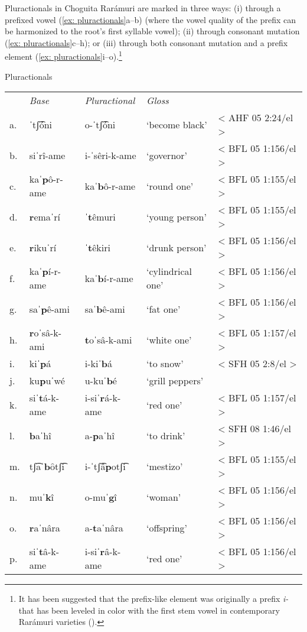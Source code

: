 Pluractionals in Choguita Rarámuri are marked in three ways: (i) through a prefixed vowel (\ref{ex: pluractionals}a--b) (where the vowel quality of the prefix can be harmonized to the root’s first syllable vowel); (ii) through consonant mutation (\ref{ex: pluractionals}c--h); or (iii) through both consonant mutation and a prefix element (\ref{ex: pluractionals}i--o).\footnote{It has been suggested that the prefix-like element was originally a prefix \textit{i-} that has been leveled in color with the first stem vowel in contemporary Rarámuri varieties (\citealt{lionnet2001elementos}).}

\ea\label{ex: pluractionals}
{Pluractionals}
\setlength{\tabcolsep}{4pt}
\begin{tabular}{lllll}
        & \textit{Base} & \textit{Pluractional} & \textit{Gloss} & \\
     a. & ˈtʃ͡óni & {o-ˈtʃ͡óni} & {`become black'} & < AHF 05 2:24/el > \\
     b. & {siˈrî-ame} & {i-ˈsêri-k-ame} & {`governor'} & {< BFL 05 1:156/el >}\\
     c. & {kaˈ\textbf{p}ô-r-ame} & {kaˈ\textbf{b}ô-r-ame} & {`round one'} & {< BFL 05 1:155/el >}\\
     d. & {\textbf{r}emaˈrí} &{ˈ\textbf{t}êmuri}&{‘young person’} & {< BFL 05 1:155/el >}\\
     e. & {\textbf{r}ikuˈrí}&{ˈ\textbf{t}êkiri}&{`drunk person'} & {< BFL 05 1:156/el >}\\
     f. & {kaˈ\textbf{p}í-r-ame}&{kaˈ\textbf{b}í-r-ame}&{`cylindrical one'} &{< BFL 05 1:156/el >}\\
     g. & {saˈ\textbf{p}ê-ami}&{saˈ\textbf{b}ê-ami}&{`fat one'} & {< BFL 05 1:156/el >}\\
     h. & {\textbf{r}oˈsâ-k-ami}&{\textbf{t}oˈsâ-k-ami}&{`white one'}& {< BFL 05 1:157/el >}\\
     i. & {kiˈ\textbf{p}á}&{i-kiˈ\textbf{b}á}&{`to snow'} & {< SFH 05 2:8/el >}\\
     j. & {ku\textbf{p}uˈwé}&{u-kuˈ\textbf{b}é}&{`grill peppers'}\\
     k. & {siˈ\textbf{t}á-k-ame}&{i-siˈ\textbf{r}á-k-ame}&{`red one'}& {< BFL 05 1:157/el >}\\
     l. & \textbf{b}aˈhî & {a-\textbf{p}aˈhî}&{`to drink'} & {< SFH 08 1:46/el >}\\
     m. & tʃ͡aˈ\textbf{b}ȏtʃ͡i  &{i-ˈtʃ͡â\textbf{p}otʃ͡i}&{`mestizo'}& {< BFL 05 1:155/el >}\\
     n. & muˈ\textbf{k}î&{o-muˈ\textbf{g}î}&{`woman'}& {< BFL 05 1:156/el >}\\
     o. & \textbf{r}aˈnâra&{a-\textbf{t}aˈnâra}&{‘offspring’}& {< BFL 05 1:156/el >}\\
     p. & {siˈ\textbf{t}â-k-ame}&{i-siˈ\textbf{r}â-k-ame}&{`red one'}& {< BFL 05 1:156/el >}\\
\end{tabular}
\z

